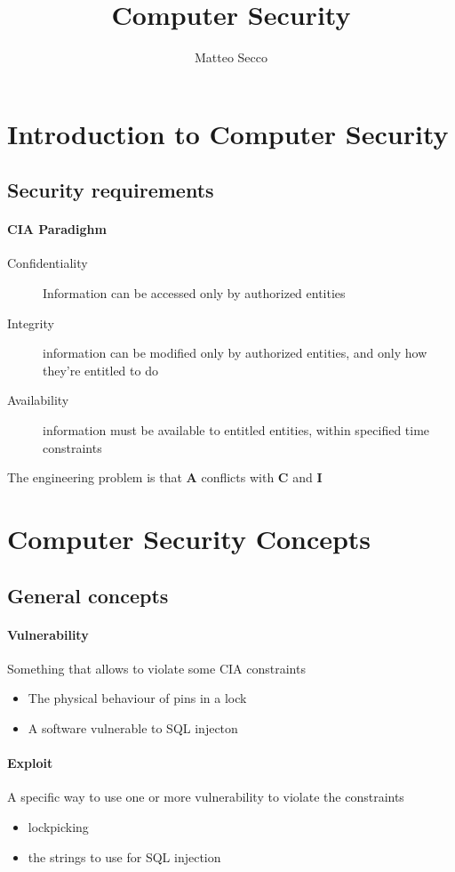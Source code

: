 \documentclass{article}
\author{Matteo Secco}
\title{Computer Security}
\begin{document}
\maketitle
\newpage
\tableofcontents
\newpage

\section{Introduction to Computer Security}
\subsection{Security requirements}
\paragraph{CIA Paradighm}
\begin{description}
\item[Confidentiality] Information can be accessed only by authorized entities
\item[Integrity] information can be modified only by authorized entities, and only how they're entitled to do
\item[Availability] information must be available to entitled entities, within specified time constraints
\end{description}
The engineering problem is that \textbf{A} conflicts with \textbf{C} and \textbf{I}

\section{Computer Security Concepts}
\subsection{General concepts}

\paragraph{Vulnerability} Something that allows to violate some CIA constraints
\begin{itemize}
\item The physical behaviour of pins in a lock
\item A software vulnerable to SQL injecton
\end{itemize}

\paragraph{Exploit} A specific way to use one or more vulnerability to violate the constraints
\begin{itemize}
\item lockpicking
\item the strings to use for SQL injection
\end{itemize}
\end{document}
